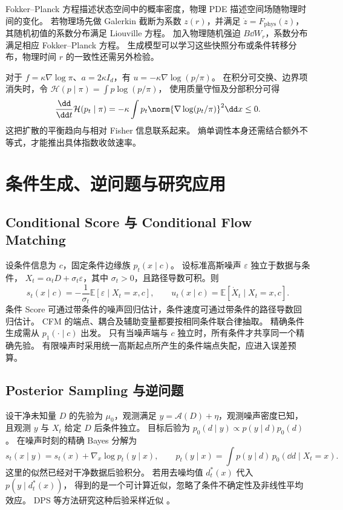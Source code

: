 Fokker--Planck 方程描述状态空间中的概率密度，物理 PDE 描述空间场随物理时间的变化。
若物理场先做 Galerkin 截断为系数 \(z(r)\)，并满足
\(\dot z=F_{\mathrm{phys}}(z)\)，其随机初值的系数分布满足 Liouville 方程。
加入物理随机强迫 \(B\dd W_r\)，系数分布满足相应 Fokker--Planck 方程。
生成模型可以学习这些快照分布或条件转移分布，物理时间 \(r\) 的一致性还需另外检验。

对于 \(f=\kappa\nabla\log\pi\)、\(a=2\kappa I_d\)，有
\(u=-\kappa\nabla\log(p/\pi)\)。
在积分可交换、边界项消失时，令 \(\mathcal H(p\mid\pi)=\int p\log(p/\pi)\)，
使用质量守恒及分部积分可得
\begin{equation}
 \frac{\dd}{\dd t}\mathcal H(p_t\mid\pi)
 =-\kappa\int p_t\norm{\nabla\log(p_t/\pi)}^2\dd x\le0.
 \label{eq:unified-entropy-dissipation}
\end{equation}
这把扩散的平衡趋向与相对 Fisher 信息联系起来。
熵单调性本身还需结合额外不等式，才能推出具体指数收敛速率。

\section{条件生成、逆问题与研究应用}
\label{sec:unified-conditioning}

\subsection{Conditional Score 与 Conditional Flow Matching}

设条件信息为 \(c\)，固定条件边缘族 \(p_t(x\mid c)\)。
设标准高斯噪声 \(\varepsilon\) 独立于数据与条件，
\(X_t=\alpha_tD+\sigma_t\varepsilon\)，其中 \(\sigma_t>0\)，且路径导数可积。则
\begin{equation}
 s_t(x\mid c)=-\frac1{\sigma_t}\mathbb E[\varepsilon\mid X_t=x,c],\qquad
 u_t(x\mid c)=\mathbb E[\dot X_t\mid X_t=x,c].
 \label{eq:unified-conditional-fields}
\end{equation}
条件 Score 可通过带条件的噪声回归估计，条件速度可通过带条件的路径导数回归估计。
CFM 的端点、耦合及辅助变量都要按相同条件联合律抽取。
精确条件生成需从 \(p_1(\cdot\mid c)\) 出发。
只有当噪声端与 \(c\) 独立时，所有条件才共享同一个精确先验。
有限噪声时采用统一高斯起点所产生的条件端点失配，应进入误差预算。

\subsection{Posterior Sampling 与逆问题}

设干净未知量 \(D\) 的先验为 \(\mu_0\)，观测满足
\(y=\mathcal A(D)+\eta\)，观测噪声密度已知，且观测 \(y\) 与 \(X_t\) 给定 \(D\) 后条件独立。
目标后验为 \(p_0(d\mid y)\propto p(y\mid d)p_0(d)\)。
在噪声时刻的精确 Bayes 分解为
\begin{equation}
 s_t(x\mid y)=s_t(x)+\nabla_x\log p_t(y\mid x),\qquad
 p_t(y\mid x)=\int p(y\mid d)\,p_0(\dd d\mid X_t=x).
 \label{eq:unified-posterior-score}
\end{equation}
这里的似然已经对干净数据后验积分。
若用去噪均值 \(d_t^*(x)\) 代入 \(p(y\mid d_t^*(x))\)，
得到的是一个可计算近似，忽略了条件不确定性及非线性平均效应。
DPS 等方法研究这种后验采样近似 \cite{chung2023dps}。


